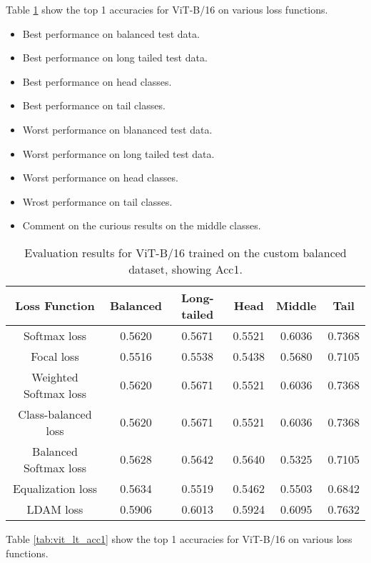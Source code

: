 Table \ref{tab:vit_bal_acc1_1} show the top 1 accuracies for ViT-B/16 on various loss functions.

\begin{itemize}
    \item Best performance on balanced test data.
    \item Best performance on long tailed test data.
    \item Best performance on head classes.
    \item Best performance on tail classes.
    \item Worst performance on blananced test data.
    \item Worst performance on long tailed test data.
    \item Worst performance on head classes.
    \item Wrost performance on tail classes.
    \item Comment on the curious results on the middle classes.
\end{itemize}

\begin{table}[H]
    \centering
    \begin{tabular}{cccccc}
        \toprule
        Loss Function & Balanced & Long-tailed & Head & Middle & Tail \\ 
        \midrule
        Softmax loss   & 0.5620 & 0.5671 & 0.5521 & 0.6036 & 0.7368 \\
        Focal loss   & 0.5516 & 0.5538 & 0.5438 & 0.5680 & 0.7105 \\
        Weighted Softmax loss   & 0.5620 & 0.5671 & 0.5521 & 0.6036 & 0.7368 \\
        Class-balanced loss   & 0.5620 & 0.5671 &  0.5521 & 0.6036 & 0.7368 \\
        Balanced Softmax loss   & 0.5628 & 0.5642 & 0.5640 & 0.5325 & 0.7105 \\
        Equalization loss   & 0.5634   & 0.5519 & 0.5462 & 0.5503 & 0.6842 \\
        LDAM loss   & 0.5906 &  0.6013 & 0.5924 & 0.6095 & 0.7632 \\
        \bottomrule
    \end{tabular}
    \caption{Evaluation results for ViT-B/16 trained on the custom balanced dataset, showing Acc1.}
    \label{tab:vit_bal_acc1_1}
\end{table}

Table \ref{tab:vit_lt_acc1} show the top 1 accuracies for ViT-B/16 on various loss functions.

